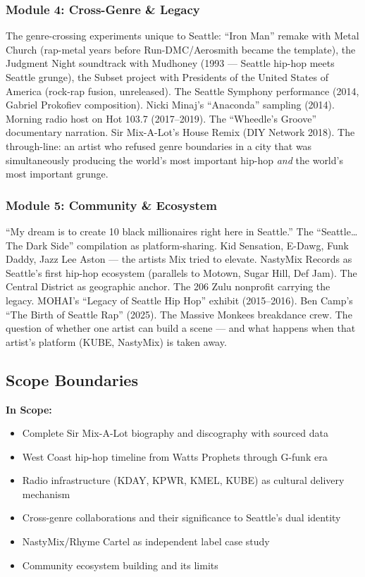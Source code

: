 \documentclass[11pt,letterpaper]{article}
\begin{document}
\subsubsection{Module 4: Cross-Genre \& Legacy}
The genre-crossing experiments unique to Seattle: ``Iron Man'' remake with Metal Church (rap-metal years before Run-DMC/Aerosmith became the template), the Judgment Night soundtrack with Mudhoney (1993 --- Seattle hip-hop meets Seattle grunge), the Subset project with Presidents of the United States of America (rock-rap fusion, unreleased). The Seattle Symphony performance (2014, Gabriel Prokofiev composition). Nicki Minaj's ``Anaconda'' sampling (2014). Morning radio host on Hot 103.7 (2017--2019). The ``Wheedle's Groove'' documentary narration. Sir Mix-A-Lot's House Remix (DIY Network 2018). The through-line: an artist who refused genre boundaries in a city that was simultaneously producing the world's most important hip-hop \textit{and} the world's most important grunge.

\subsubsection{Module 5: Community \& Ecosystem}
``My dream is to create 10 black millionaires right here in Seattle.'' The ``Seattle\ldots The Dark Side'' compilation as platform-sharing. Kid Sensation, E-Dawg, Funk Daddy, Jazz Lee Aston --- the artists Mix tried to elevate. NastyMix Records as Seattle's first hip-hop ecosystem (parallels to Motown, Sugar Hill, Def Jam). The Central District as geographic anchor. The 206 Zulu nonprofit carrying the legacy. MOHAI's ``Legacy of Seattle Hip Hop'' exhibit (2015--2016). Ben Camp's ``The Birth of Seattle Rap'' (2025). The Massive Monkees breakdance crew. The question of whether one artist can build a scene --- and what happens when that artist's platform (KUBE, NastyMix) is taken away.

\subsection{Scope Boundaries}

\textbf{In Scope:}
\begin{itemize}[leftmargin=2em]
\item Complete Sir Mix-A-Lot biography and discography with sourced data
\item West Coast hip-hop timeline from Watts Prophets through G-funk era
\item Radio infrastructure (KDAY, KPWR, KMEL, KUBE) as cultural delivery mechanism
\item Cross-genre collaborations and their significance to Seattle's dual identity
\item NastyMix/Rhyme Cartel as independent label case study
\item Community ecosystem building and its limits
\end{itemize}
\end{document}
